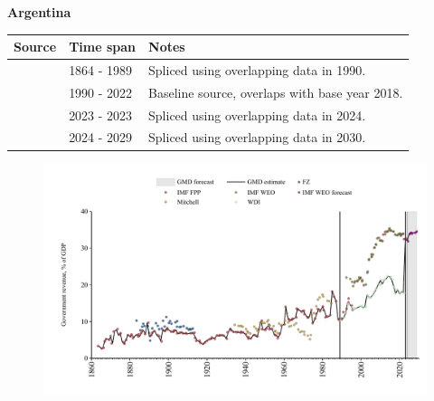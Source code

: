 \documentclass[12pt,a4paper,landscape]{article}
\begin{document}
\begin{adjustbox}{max totalsize={\paperwidth}{\paperheight},center}
\begin{minipage}[t][\textheight][t]{\textwidth}
\vspace*{0.5cm}
{}
\begin{center}
{\Large\bfseries Argentina}
\end{center}
\vspace{0.5cm}
\begin{table}[H]
\centering
\small
\begin{tabular}{|l|l|l|}
\hline
\textbf{Source} & \textbf{Time span} & \textbf{Notes} \\
\hline
\rowcolor{white}\cite{IMF_FPP}& 1864 - 1989 &Spliced using overlapping data in 1990.\\
\rowcolor{lightgray}\cite{WDI}& 1990 - 2022 &Baseline source, overlaps with base year 2018.\\
\rowcolor{white}\cite{IMF_FPP}& 2023 - 2023 &Spliced using overlapping data in 2024.\\
\rowcolor{lightgray}\cite{IMF_WEO_forecast}& 2024 - 2029 &Spliced using overlapping data in 2030.\\
\hline
\end{tabular}
\end{table}
\begin{figure}[H]
\centering
\includegraphics[width=\textwidth,height=0.6\textheight,keepaspectratio]{graphs/ARG_govrev_GDP.pdf}
\end{figure}
\end{minipage}
\end{adjustbox}
\end{document}
